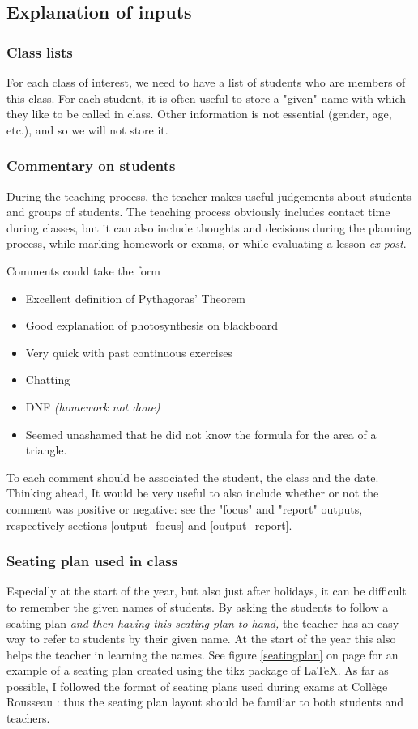 \documentclass[10pt]{article}
\begin{document}
\subsection{Explanation of inputs}

\subsubsection{Class lists}
For each class of interest, we need to have a list of students who are members of this class. For each student, it is often useful to store a "given" name with which they like to be called in class. Other information is not essential (gender, age, etc.), and so we will not store it.

\subsubsection{Commentary on students}
During the teaching process, the teacher makes useful judgements about students and groups of students. The teaching process obviously includes contact time during classes, but it can also include thoughts and decisions during the planning process, while marking homework or exams, or while evaluating a lesson \emph{ex-post}.

Comments could take the form
\begin{itemize}
\item Excellent definition of Pythagoras' Theorem
\item Good explanation of photosynthesis on blackboard
\item Very quick with past continuous exercises
\item Chatting
\item DNF \emph{(homework not done)}
\item Seemed unashamed that he did not know the formula for the area of a triangle.
\end{itemize}

To each comment should be associated the student, the class and the date. Thinking ahead, It would be very useful to also include whether or not the comment was positive or negative: see the "focus" and "report" outputs, respectively sections \ref{output_focus} and \ref{output_report}.

\subsubsection{Seating plan used in class}
Especially at the start of the year, but also just after holidays, it can be difficult to remember the given names of students. By asking the students to follow a seating plan \emph{and then having this seating plan to hand,} the teacher has an easy way to refer to students by their given name. At the start of the year this also helps the teacher in learning the names. See figure \ref{seatingplan} on page \pageref{seatingplan} for an example of a seating plan created using the tikz package of LaTeX. As far as possible, I followed the format of seating plans used during exams at Collège Rousseau : thus the seating plan layout should be familiar to both students and teachers.
\end{document}
